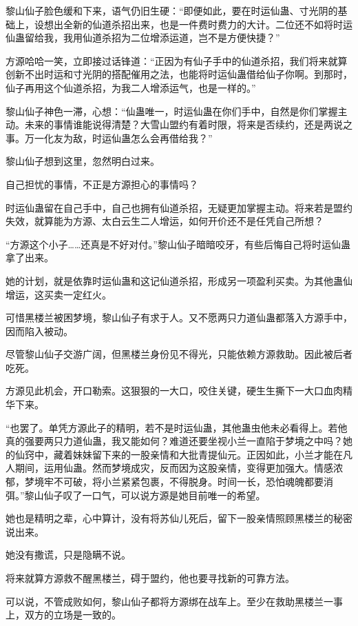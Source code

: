 \begin{this_body}
黎山仙子脸色缓和下来，语气仍旧生硬：“即便如此，要在时运仙蛊、寸光阴的基础上，设想出全新的仙道杀招出来，也是一件费时费力的大计。二位还不如将时运仙蛊留给我，我用仙道杀招为二位增添运道，岂不是方便快捷？”

方源哈哈一笑，立即接过话锋道：“正因为有仙子手中的仙道杀招，我们将来就算创新不出时运和寸光阴的搭配催用之法，也能将时运仙蛊借给仙子你啊。到那时，仙子再用这个仙道杀招，为我二人增添运气，也是一样的。”

黎山仙子神色一滞，心想：“仙蛊唯一，时运仙蛊在你们手中，自然是你们掌握主动。未来的事情谁能说得清楚？大雪山盟约有着时限，将来是否续约，还是两说之事。万一化友为敌，时运仙蛊怎么会再借给我？”

黎山仙子想到这里，忽然明白过来。

自己担忧的事情，不正是方源担心的事情吗？

时运仙蛊留在自己手中，自己也拥有仙道杀招，无疑更加掌握主动。将来若是盟约失效，就算能为方源、太白云生二人增运，如何开价还不是任凭自己所想？

“方源这个小子……还真是不好对付。”黎山仙子暗暗咬牙，有些后悔自己将时运仙蛊拿了出来。

她的计划，就是依靠时运仙蛊和这记仙道杀招，形成另一项盈利买卖。为其他蛊仙增运，这买卖一定红火。

可惜黑楼兰被困梦境，黎山仙子有求于人。又不愿两只力道仙蛊都落入方源手中，因而陷入被动。

尽管黎山仙子交游广阔，但黑楼兰身份见不得光，只能依赖方源救助。因此被后者吃死。

方源见此机会，开口勒索。这狠狠的一大口，咬住关键，硬生生撕下一大口血肉精华下来。

“也罢了。单凭方源此子的精明，若不是时运仙蛊，其他蛊虫他未必看得上。若他真的强要两只力道仙蛊，我又能如何？难道还要坐视小兰一直陷于梦境之中吗？她的仙窍中，藏着妹妹留下来的一股亲情和大批青提仙元。正因如此，小兰才能在凡人期间，运用仙蛊。然而梦境成灾，反而因为这股亲情，变得更加强大。情感浓郁，梦境牢不可破，将小兰紧紧包裹，不得脱身。时间一长，恐怕魂魄都要消弭。”黎山仙子叹了一口气，可以说方源是她目前唯一的希望。

她也是精明之辈，心中算计，没有将苏仙儿死后，留下一股亲情照顾黑楼兰的秘密说出来。

她没有撒谎，只是隐瞒不说。

将来就算方源救不醒黑楼兰，碍于盟约，他也要寻找新的可靠方法。

可以说，不管成败如何，黎山仙子都将方源绑在战车上。至少在救助黑楼兰一事上，双方的立场是一致的。


\end{this_body}
